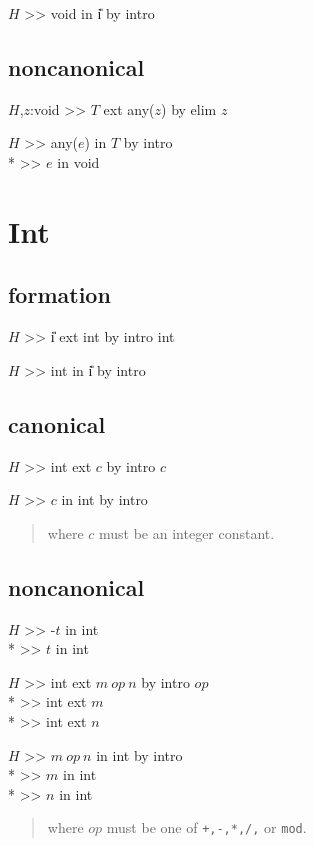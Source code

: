 \goalskip

\goal $H$ >> void in \U{i}  by intro

\subsection*{noncanonical}
\goal $H$,$z$:void >> $T$ ext any($z$) by elim $z$
                                             

\goalskip

\goal $H$ >> any($e$) in $T$  by intro \\*
\subgoal >> $e$ in void
\par

\section{Int}
\subsection*{formation}
\goal $H$ >> \U{i} ext int by intro int  


\goalskip

\goal $H$ >> int in \U{i}  by intro

\subsection*{canonical}
\goal $H$ >> int ext $c$ by intro $c$


\goalskip

\goal $H$ >> $c$ in int by intro
\begin{quote}\rm
where $c$ must be an integer constant.
\end{quote}

\subsection*{noncanonical}
\goal $H$ >> -$t$ in int \\*
\subgoal >> $t$ in int

\goalskip

\goal $H$ >> int ext $m\ op\ n$ by intro $op$ \\*
\subgoal >> int ext $m$\\*
\subgoal >> int ext $n$

\goalskip

\goal $H$ >> $m\ op\ n$ in int by intro \\*
\subgoal >> $m$ in int \\*
\subgoal >> $n$ in int
\begin{quote}\rm
where  $op$ must be one of {\tt +,-,*,/,} or {\tt mod}.
\end{quote}

